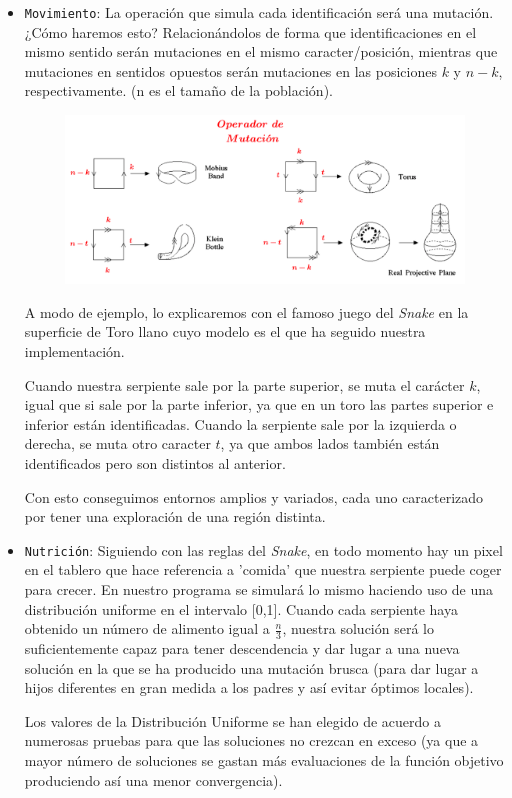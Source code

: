 \begin{itemize}
	\item \texttt{Movimiento}: La operación que simula cada identificación será una mutación. ¿Cómo haremos esto? Relacionándolos de forma que identificaciones en el mismo sentido serán mutaciones en el mismo caracter/posición, mientras que mutaciones en sentidos opuestos serán mutaciones en las posiciones $k$ y $n-k$, respectivamente. (n es el tamaño de la población).
	
	
	\begin{figure}[H]
		\centering
		\includegraphics[scale=0.38]{img/topo6.png}
	\end{figure}
	
	
		A modo de ejemplo, lo explicaremos con el famoso juego del \textit{Snake} en la superficie de Toro llano cuyo modelo es el que ha seguido nuestra implementación.
		
	Cuando nuestra serpiente sale por la parte superior, se muta el carácter $k$, igual que si sale por la parte inferior, ya que en un toro las partes superior e inferior están identificadas. Cuando la serpiente sale por la izquierda o derecha, se muta otro caracter $t$, ya que ambos lados también están identificados pero son distintos al anterior.
	
	Con esto conseguimos entornos amplios y variados, cada uno caracterizado por tener una exploración de una región distinta. \\
	
	
	\item \texttt{Nutrición}: Siguiendo con las reglas del \textit{Snake}, en todo momento hay un pixel en el tablero que hace referencia a 'comida' que nuestra serpiente puede coger para crecer. En nuestro programa se simulará lo mismo haciendo uso de una distribución uniforme en el intervalo [0,1]. Cuando cada serpiente haya obtenido un número de alimento igual a $\frac{n}{3}$, nuestra solución será lo suficientemente capaz para tener descendencia y dar lugar a una nueva solución en la que se ha producido una mutación brusca (para dar lugar a hijos diferentes en gran medida a los padres y así evitar óptimos locales). 
	
	Los valores de la Distribución Uniforme se han elegido de acuerdo a numerosas pruebas para que las soluciones no crezcan en exceso (ya que a mayor número de soluciones se gastan más evaluaciones de la función objetivo produciendo así una menor convergencia). 
	

	

	
	
\end{itemize}

